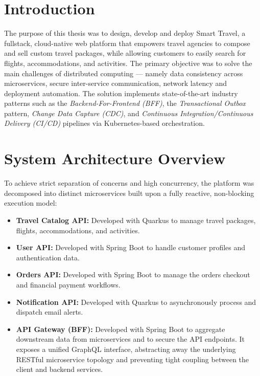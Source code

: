 \section{Introduction}

The purpose of this thesis was to design, develop and deploy Smart Travel, a fullstack, cloud-native web platform that empowers travel agencies to compose and sell custom travel packages, while allowing customers to easily search for flights, accommodations, and activities. The primary objective was to solve the main challenges of distributed computing --- namely data consistency across microservices, secure inter-service communication, network latency and deployment automation. The solution implements state-of-the-art industry patterns such as the \textit{Backend-For-Frontend (BFF)}, the \textit{Transactional Outbox} pattern, \textit{Change Data Capture (CDC)}, and \textit{Continuous Integration/Continuous Delivery (CI/CD)} pipelines via Kubernetes-based orchestration.

\section{System Architecture Overview}

To achieve strict separation of concerns and high concurrency, the platform was decomposed into distinct microservices built upon a fully reactive, non-blocking execution model:

\begin{itemize}
    \item \textbf{Travel Catalog API:} Developed with Quarkus to manage travel packages, flights, accommodations, and activities.
    \item \textbf{User API:} Developed with Spring Boot to handle customer profiles and authentication data.
    \item \textbf{Orders API:} Developed with Spring Boot to manage the orders checkout and financial payment workflows.
    \item \textbf{Notification API:} Developed with Quarkus to asynchronously process and dispatch email alerts.
    \item \textbf{API Gateway (BFF):} Developed with Spring Boot to aggregate downstream data from microservices and to secure the API endpoints. It exposes a unified GraphQL interface, abstracting away the underlying RESTful microservice topology and preventing tight coupling between the client and backend services.
\end{itemize}

